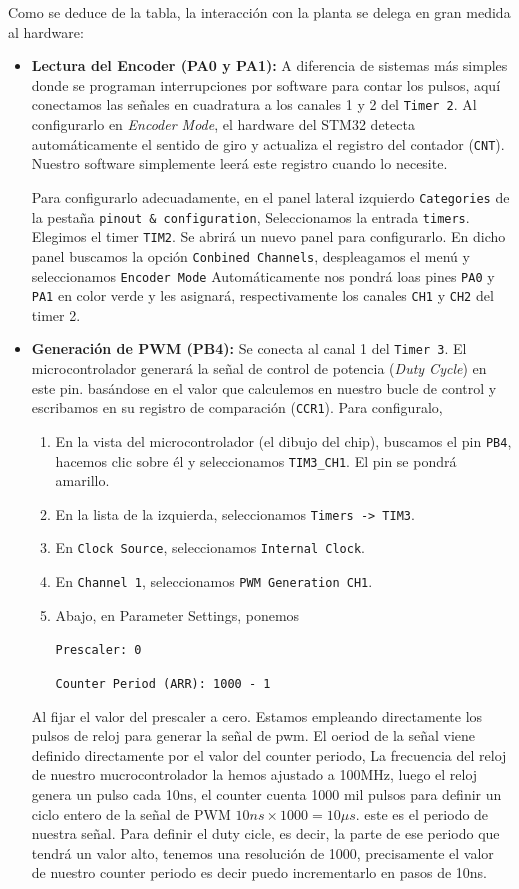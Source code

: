 Como se deduce de la tabla, la interacción con la planta se delega en gran medida al hardware:
\begin{itemize}
	\item \textbf{Lectura del Encoder (PA0 y PA1):}
A diferencia de sistemas más simples donde se programan interrupciones por software para contar los pulsos, aquí conectamos las señales en cuadratura a los canales 1 y 2 del \texttt{Timer 2}. Al configurarlo en \textit{Encoder Mode}, el hardware del STM32 detecta automáticamente el sentido de giro y actualiza el registro del contador (\texttt{CNT}). Nuestro software simplemente leerá este registro cuando lo necesite.

Para configurarlo adecuadamente, en el panel lateral izquierdo \texttt{Categories} de la pestaña \texttt{pinout \& configuration}, Seleccionamos la entrada \texttt{timers}. Elegimos el timer \texttt{TIM2}. Se abrirá un nuevo panel para configurarlo. En dicho panel buscamos la opción \texttt{Conbined Channels}, despleagamos el menú y seleccionamos \texttt{Encoder Mode} Automáticamente nos pondrá loas pines \texttt{PA0} y \texttt{PA1} en color verde y les asignará, respectivamente los canales \texttt{CH1} y \texttt{CH2} del timer 2.

	
	\item \textbf{Generación de PWM (PB4):} Se conecta al canal 1 del \texttt{Timer 3}. El microcontrolador generará la señal de control de potencia (\textit{Duty Cycle}) en este pin. basándose en el valor que calculemos en nuestro bucle de control y escribamos en su registro de comparación (\texttt{CCR1}).
Para configuralo,
\begin{enumerate}
\item En la vista del microcontrolador (el dibujo del chip), buscamos el pin \texttt{PB4}, hacemos clic sobre él y seleccionamos \texttt{TIM3\_CH1}. El pin se pondrá amarillo.
	\item En la lista de la izquierda, seleccionamos  \texttt{Timers -> TIM3}.
	\item En \texttt{Clock Source}, seleccionamos \texttt{Internal Clock}.
	\item En \texttt{Channel 1}, seleccionamos \texttt{PWM Generation CH1}.
	\item  Abajo, en Parameter Settings, ponemos

    \texttt{Prescaler: 0}

    \texttt{Counter Period (ARR): 1000 - 1} 
\end{enumerate}
Al fijar el valor del prescaler a cero. Estamos empleando directamente los pulsos de reloj para generar la señal de pwm. El oeriod de la señal viene definido directamente por el valor del counter periodo, La frecuencia del reloj de nuestro mucrocontrolador la hemos ajustado a 100MHz, luego el reloj genera un pulso cada 10ns, el counter cuenta 1000 mil pulsos para definir un ciclo entero de la señal de PWM $10ns\times 1000 = 10\mu s$. este es el periodo de nuestra señal. Para definir el duty cicle, es decir, la parte de ese periodo que tendrá un valor alto, tenemos una resolución de 1000, precisamente el valor de nuestro counter periodo es decir puedo incrementarlo en pasos de 10ns.


\end{itemize}

